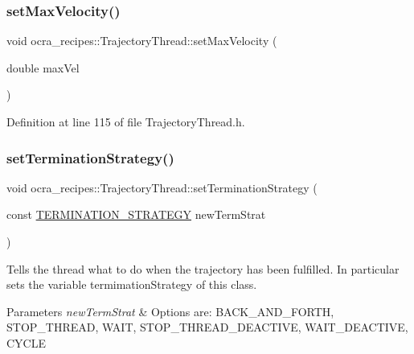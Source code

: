 \subsubsection{\texorpdfstring{set\+Max\+Velocity()}{setMaxVelocity()}}
{\footnotesize\ttfamily void ocra\+\_\+recipes\+::\+Trajectory\+Thread\+::set\+Max\+Velocity (\begin{DoxyParamCaption}\item[{double}]{max\+Vel }\end{DoxyParamCaption})\hspace{0.3cm}{\ttfamily [inline]}}



Definition at line 115 of file Trajectory\+Thread.\+h.

\hypertarget{classocra__recipes_1_1TrajectoryThread_ab401be5b4261576175d690b6e4a61177}{}\label{classocra__recipes_1_1TrajectoryThread_ab401be5b4261576175d690b6e4a61177} 
\subsubsection{\texorpdfstring{set\+Termination\+Strategy()}{setTerminationStrategy()}}
{\footnotesize\ttfamily void ocra\+\_\+recipes\+::\+Trajectory\+Thread\+::set\+Termination\+Strategy (\begin{DoxyParamCaption}\item[{const \hyperlink{namespaceocra__recipes_afcf7ca623a6c39b246aa4bda629c7309}{T\+E\+R\+M\+I\+N\+A\+T\+I\+O\+N\+\_\+\+S\+T\+R\+A\+T\+E\+GY}}]{new\+Term\+Strat }\end{DoxyParamCaption})\hspace{0.3cm}{\ttfamily [inline]}}

Tells the thread what to do when the trajectory has been fulfilled. In particular sets the variable termimation\+Strategy of this class.


\begin{DoxyParams}{Parameters}
{\em new\+Term\+Strat} & Options are\+: B\+A\+C\+K\+\_\+\+A\+N\+D\+\_\+\+F\+O\+R\+TH, S\+T\+O\+P\+\_\+\+T\+H\+R\+E\+AD, W\+A\+IT, S\+T\+O\+P\+\_\+\+T\+H\+R\+E\+A\+D\+\_\+\+D\+E\+A\+C\+T\+I\+VE, W\+A\+I\+T\+\_\+\+D\+E\+A\+C\+T\+I\+VE, C\+Y\+C\+LE \\
\hline
\end{DoxyParams}


